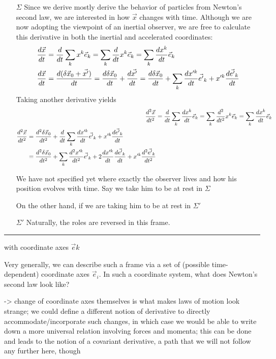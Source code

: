 \documentclass[../class_mech_main.tex]{subfiles}
\begin{document}
\begin{itemize}
	\item[$\Sigma$] Since we derive mostly derive the behavior of particles from Newton's second law, we are interested in how $\vec{x}$ changes with time. Although we are now adopting the viewpoint of an inertial observer, we are free to calculate this derivative in both the inertial and accelerated coordinates:
	\begin{align}
		\dv{\vec{x}}{t} &= \dv{t} \sum_k x^k \vec{e}_k = \sum_k \dv{t} x^k \vec{e}_k = \sum_k \dv{x^k}{t} \vec{e}_k
		\\
		\dv{\vec{x}}{t} &= \dv{(\delta \vec{x}_0 + \vec{x'})}{t} = \dv{\delta \vec{x}_0}{t} + \dv{\vec{x'}}{t} = \dv{\delta \vec{x}_0}{t} + \sum_k \dv{x'^k}{t} \vec{e'}_k + x'^k \dv{\vec{e'}_k}{t}
		\label{eq:velocity_accel_frame}
	\end{align}
	Taking another derivative yields
	\begin{align}
		\dv[2]{\vec{x}}{t} &= \dv{t} \sum_k \dv{x^k}{t} \vec{e}_k = \sum_k \dv[2]{t} x^k \vec{e}_k = \sum_k \dv{x^k}{t} \vec{e}_k
		\\
		\begin{split}
			\dv[2]{\vec{x}}{t} &= \dv[2]{\delta \vec{x}_0}{t} + \dv{t} \sum_k \dv{x'^k}{t} \vec{e'}_k + x'^k \dv{\vec{e'}_k}{t}
			\\
			&= \dv[2]{\delta \vec{x}_0}{t} + \sum_k \dv[2]{x'^k}{t} \vec{e'}_k + 2 \dv{x'^k}{t} \dv{\vec{e'}_k}{t} + x'^k \dv[2]{\vec{e'}_k}{t}
		\end{split}
		\label{eq:acceleration_accel_frame}
	\end{align}

	We have not specified yet where exactly the observer lives and how his position evolves with time. Say we take him to be at rest in $\Sigma$


	On the other hand, if we are taking him to be at rest in $\Sigma'$
	

	\item[$\Sigma'$] Naturally, the roles are reversed in this frame.
\end{itemize}



\hrule


with coordinate axes $\vec{e}k$

Very generally, we can describe such a frame via a set of (possible time-dependent) coordinate axes $\vec{e}_i$. In such a coordinate system, what does Newton's second law look like?


-> change of coordinate axes themselves is what makes laws of motion look strange; we could define a different notion of derivative to directly accommodate/incorporate such changes, in which case we would be able to write down a more universal relation involving forces and momenta; this can be done and leads to the notion of a covariant derivative, a path that we will not follow any further here, though
\end{document}
